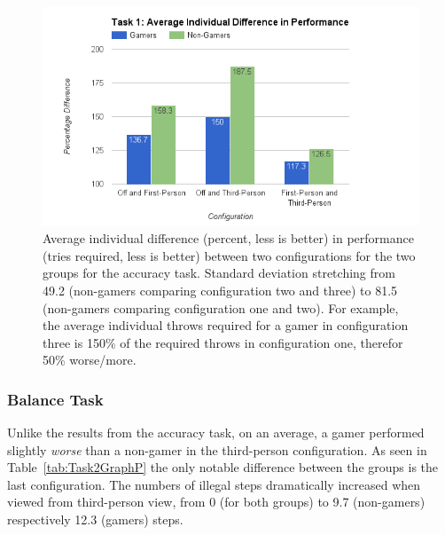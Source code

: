 \documentclass[runningheads,a4paper,oribibl]{llncs}
\begin{document}

\begin{figure}
   \centering
   \includegraphics[width=\textwidth]{ExternalMaterial/Task1GraphD}
   \caption{Average individual difference (percent, less is better) in performance (tries required, less is better) between two configurations for the two groups for the accuracy task. Standard deviation stretching from 49.2 (non-gamers comparing configuration two and three) to 81.5 (non-gamers comparing configuration one and two). For example, the average individual throws required for a gamer in configuration three is 150\% of the required throws in configuration one, therefor 50\% worse/more.} \label{fig:Task1GraphD}
\end{figure}












\subsubsection{Balance Task}
Unlike the results from the accuracy task, on an average, a gamer performed slightly \emph{worse} than a non-gamer in the third-person configuration. As seen in Table~\ref{tab:Task2GraphP} the only notable difference between the groups is the last configuration. The numbers of illegal steps dramatically increased when viewed from third-person view, from 0 (for both groups) to 9.7 (non-gamers) respectively 12.3 (gamers) steps.  
\end{document}
